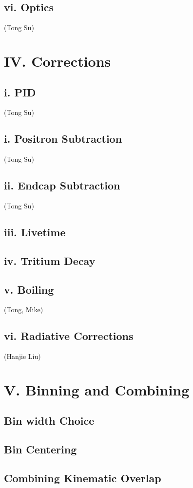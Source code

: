 \documentclass[letterpaper,aps,prl,superscriptaddress,floatfix,twocolumn]{revtex4}
\begin{document}
 
 \subsection{vi. Optics}
 (Tong Su)
 

\section{IV. Corrections}

 \subsection{i. PID}
 (Tong Su)
 

 \subsection{i. Positron Subtraction}
  (Tong Su)




 \subsection{ii. Endcap Subtraction}
 (Tong Su)

 \subsection{iii. Livetime}

 \subsection{iv. Tritium Decay}
 

 \subsection{v. Boiling}
 (Tong, Mike)

 \subsection{vi. Radiative Corrections}
 (Hanjie Liu)

\section{V. Binning and Combining}

 \subsection{Bin width Choice}

 \subsection{Bin Centering}

 \subsection{Combining Kinematic Overlap}
\end{document}

